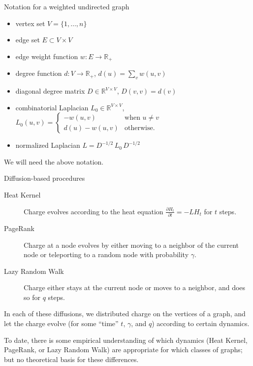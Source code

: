 \documentclass[xcolor=dvipsnames]{beamer}
\begin{document}
\begin{frame}
  \begin{block}{Notation for a weighted undirected graph}
  \begin{itemize}
    \item vertex set $V = \{ 1, \dotsc, n \}$ 
    \item edge set $E \subset V \times V$
    \item edge weight function $w : E \to \mathbb{R}_+$
    \item degree function $d : V \to \mathbb{R}_+$, $d(u) = \sum_v w(u,v)$
    \item diagonal degree matrix $D \in \mathbb{R}^{V \times V}$, $D(v,v) = d(v)$
    \item combinatorial Laplacian $L_0 \in \mathbb{R}^{V \times V}$,
    	$L_0(u,v) = \begin{cases}
		-w(u,v) &\text{when $u \neq v$} \\
		d(u) - w(u,v) &\text{otherwise.}
	\end{cases}$
    \item normalized Laplacian $L = D^{-1/2} \, L_0 \, D^{-1/2}$
  \end{itemize}
  \end{block}
  We will need the above notation.
\end{frame}

\begin{frame}
  \begin{block}{Diffusion-based procedures}
  \begin{description}
    \item[Heat Kernel] Charge evolves according to the heat equation
    	$\frac{\partial H_t}{\partial t} = - L H_t$ for $t$ steps.
    \item[PageRank] Charge at a node evolves by either moving to a neighbor
    	of the current node or teleporting to a random node with 
        probability $\gamma$.
    \item[Lazy Random Walk] Charge either stays at the current node or moves
        to a neighbor, and does so for $q$ steps.
  \end{description}
  \end{block}

  In each of these diffusions, we distributed charge on the vertices of a
  graph, and let the charge evolve (for some ``time'' $t$, $\gamma$, and $q$) 
  according to certain dynamics.  

  To date, there is some empirical understanding of which dynamics (Heat 
  Kernel, PageRank, or Lazy Random Walk) are appropriate for which classes 
  of graphs; but no theoretical basis for these differences.

\end{frame}
\end{document}
